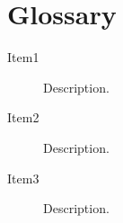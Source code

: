 \cleardoublepage

\chapter*{Glossary}

\pagestyle{plain}

\begin{description}

\item[Item1] Description.
\item[Item2] Description.
\item[Item3] Description.

\end{description}

